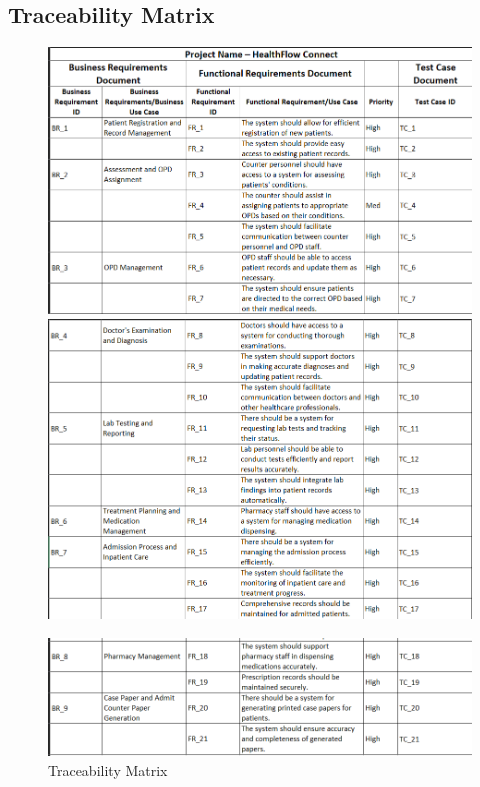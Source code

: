 \subsection{Traceability Matrix}
\begin{figure}[h!]
    \centering
    \includegraphics[width=1.1\textwidth]{tm1.png}
    \includegraphics[width=1.1\textwidth]{tm2.png}
\end{figure}
\begin{figure}[h!]
    \centering
    \includegraphics[width=1.1\textwidth]{tm3.png}
    \caption{Traceability Matrix}
\end{figure}
\clearpage
